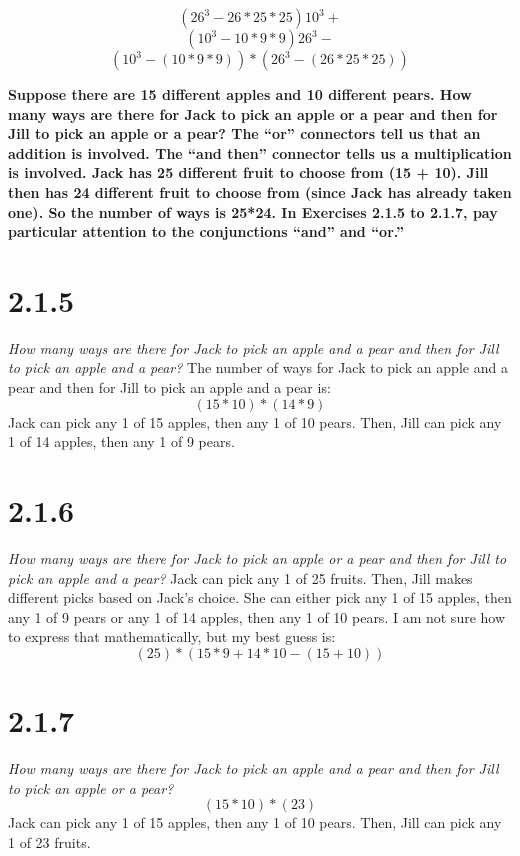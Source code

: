 \documentclass[11pt]{article} %
\begin{document}
\begin{equation} (26^3  - 26*25*25)10^3 + \end{equation} \begin{equation}(10^3  - 10*9*9)26^3  - \end{equation} \begin{equation} (10^3-(10*9*9)) * (26^3-(26*25*25))\end{equation}

\newpage
\textbf{Suppose there are 15 different apples and 10 different pears. How many ways
are there for Jack to pick an apple or a pear and then for Jill to pick an apple
or a pear? The “or” connectors tell us that an addition is involved. The “and
then” connector tells us a multiplication is involved. Jack has 25 different fruit
to choose from (15 + 10). Jill then has 24 different fruit to choose from (since
Jack has already taken one). So the number of ways is 25*24.
In Exercises 2.1.5 to 2.1.7, pay particular attention to the conjunctions “and”
and “or.”}

\section*{2.1.5} \textit{How many ways are there for Jack to pick an apple and a pear
and then for Jill to pick an apple and a pear?}
The number of ways for Jack to pick an apple and a pear and then for Jill to pick an apple and a pear is:
\begin{equation} (15*10)*(14*9) \end{equation}
Jack can pick any 1 of 15 apples, then any 1 of 10 pears. Then, Jill can pick any 1 of 14 apples, then any 1 of 9 pears. 


\section*{2.1.6} \textit{How many ways are there for Jack to pick an apple or a pear
and then for Jill to pick an apple and a pear?}
Jack can pick any 1 of 25 fruits. Then, Jill makes different picks based on Jack's choice. 
She can either pick any 1 of 15 apples, then any 1 of 9 pears or any 1 of 14 apples, then any 1 of 10 pears. 
I am not sure how to express that mathematically, but my best guess is:
\begin{equation} (25)*(15*9+14*10-(15+10)) \end{equation}

\section*{2.1.7} \textit{How many ways are there for Jack to pick an apple and a pear
and then for Jill to pick an apple or a pear?}
\begin{equation} (15*10)*(23) \end{equation}
Jack can pick any 1 of 15 apples, then any 1 of 10 pears. Then, Jill can pick any 1 of 23 fruits. 
\end{document}
